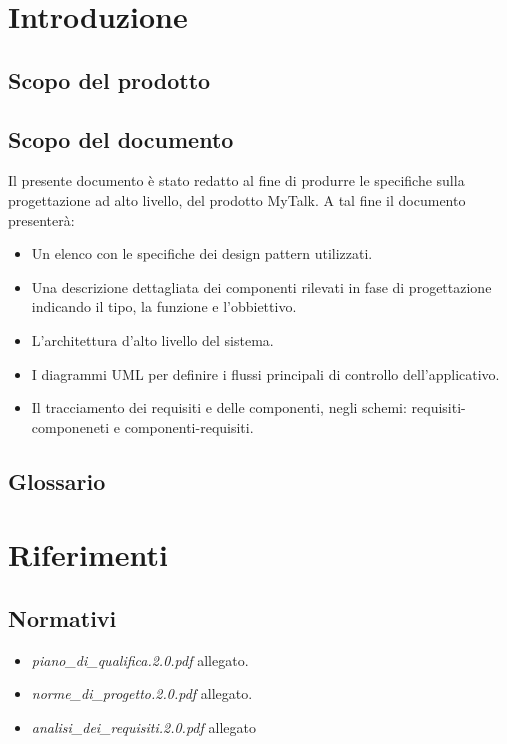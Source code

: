 

\setcounter{page}{1}
\pagestyle{normal}


\newpage

\section{Introduzione}
\subsection{Scopo del prodotto}
\purpose

\subsection{Scopo del documento}
Il presente documento è stato redatto al fine di produrre le specifiche sulla progettazione ad alto livello, del prodotto MyTalk. A tal fine il documento presenterà:

\begin{itemize}
	\item Un elenco con le specifiche dei design pattern utilizzati.
	\item Una descrizione dettagliata dei componenti rilevati in fase di progettazione indicando il tipo,
la funzione e l'obbiettivo.
	\item L'architettura d'alto livello del sistema.
	\item I diagrammi UML per definire i flussi principali di controllo dell'applicativo.
	\item Il tracciamento dei requisiti e delle componenti, negli schemi: requisiti-componeneti e componenti-requisiti.
\end{itemize}

\subsection{Glossario}
\glossaryIntro

\clearpage
\section{Riferimenti}

\subsection{Normativi}
\begin{itemize}
\item[] \textit{piano\_di\_qualifica.2.0.pdf} allegato.
\item[] \textit{norme\_di\_progetto.2.0.pdf} allegato.
\item[] \textit{analisi\_dei\_requisiti.2.0.pdf} allegato
\end{itemize}

